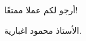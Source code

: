 \documentclass[14pt]{extarticle}
\begin{document}
\begin{enumerate}[itemsep=2em]
\end{enumerate}


\vspace{1cm}
\begin{flushleft}
أرجو لكم عملا ممتعًا!

الأستاذ محمود اغبارية.
\end{flushleft}
\end{document}
